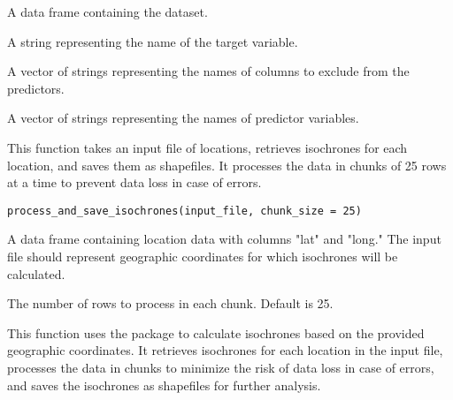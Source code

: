 \documentclass[a4paper]{book}
\begin{document}
%
\begin{Arguments}
\begin{ldescription}
\item[\code{df}] A data frame containing the dataset.

\item[\code{target\_variable}] A string representing the name of the target variable.

\item[\code{excluded\_columns}] A vector of strings representing the names of columns to exclude from the predictors.
\end{ldescription}
\end{Arguments}
%
\begin{Value}
A vector of strings representing the names of predictor variables.
\end{Value}
%
\begin{Description}
This function takes an input file of locations, retrieves isochrones for each location,
and saves them as shapefiles. It processes the data in chunks of 25 rows at a time to
prevent data loss in case of errors.
\end{Description}
%
\begin{Usage}
\begin{verbatim}
process_and_save_isochrones(input_file, chunk_size = 25)
\end{verbatim}
\end{Usage}
%
\begin{Arguments}
\begin{ldescription}
\item[\code{input\_file}] A data frame containing location data with columns "lat" and "long."
The input file should represent geographic coordinates for which
isochrones will be calculated.

\item[\code{chunk\_size}] The number of rows to process in each chunk. Default is 25.
\end{ldescription}
\end{Arguments}
%
\begin{Details}
This function uses the  package to calculate isochrones based on the
provided geographic coordinates. It retrieves isochrones for each location in
the input file, processes the data in chunks to minimize the risk of data loss
in case of errors, and saves the isochrones as shapefiles for further analysis.
\end{Details}
\end{document}
